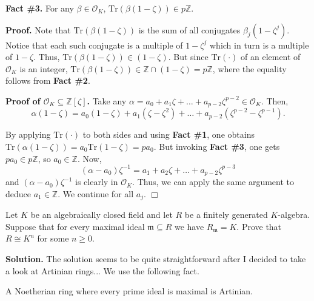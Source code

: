 \documentclass{template}
\newcommand{\qedwhite}{\hfill \ensuremath{\Box}}
\begin{document}
\textcolor{blue!70!black}{\textbf{Fact \#3.}} For any $\beta \in \mathcal{O}_K$,
$\text{Tr}(\beta(1-\zeta)) \in p\mathbb{Z}$. 

\textbf{Proof.} Note that $\text{Tr}(\beta(1-\zeta))$ is the sum of all
conjugates $\beta_j(1-\zeta^j)$. Notice that each such conjugate is a multiple
of $1-\zeta^j$ which in turn is a multiple of $1-\zeta$. Thus,
$\text{Tr}(\beta(1-\zeta)) \in (1-\zeta)$. But since $\text{Tr}(\cdot)$ of an
element of $\mathcal{O}_K$ is an integer, $\text{Tr}(\beta(1-\zeta)) \in
\mathbb{Z} \cap (1-\zeta) = p\mathbb{Z}$, where the equality follows from
\textcolor{blue!70!black}{\textbf{Fact \#2}}.

\textcolor{green!50!black}{\textbf{Proof of $\mathcal{O}_K \subseteq
\mathbb{Z}[\zeta]$.}} Take any $\alpha = a_0+a_1\zeta+\dots+a_{p-2}\zeta^{p-2}
\in \mathcal{O}_K$. Then,
\begin{equation*}
    \alpha(1-\zeta) = a_0(1-\zeta) + a_1(\zeta-\zeta^2) + \dots + a_{p-2}(\zeta^{p-2}-\zeta^{p-1}).
\end{equation*}

By applying $\text{Tr}(\cdot)$ to both sides and using
\textcolor{blue!70!black}{\textbf{Fact \#1}}, one obtains
$\text{Tr}(\alpha(1-\zeta)) = a_0\text{Tr}(1-\zeta) = pa_0$. But invoking
\textcolor{blue!70!black}{\textbf{Fact \#3}}, one gets $pa_0 \in p\mathbb{Z}$,
so $a_0 \in \mathbb{Z}$. Now,
\begin{equation*}
    (\alpha - a_0)\zeta^{-1} = a_1 + a_2\zeta + \dots + a_{p-2}\zeta^{p-3}
\end{equation*}
and $(\alpha-a_0)\zeta^{-1}$ is clearly in $\mathcal{O}_K$. Thus, we can apply
the same argument to deduce $a_1 \in \mathbb{Z}$. We continue for all $a_j$. \qedwhite

\begin{problem}[Exercise 3]
    Let $K$ be an algebraically closed field and let $R$ be a finitely generated
    $K$-algebra. Suppose that for every maximal ideal $\mathfrak{m} \subseteq R$
    we have $R_{\mathfrak{m}} = K$. Prove that $R \cong K^n$ for some $n \geq
    0$.
\end{problem}

\textbf{Solution.} The solution seems to be quite straightforward after I
decided to take a look at Artinian rings... We use the following fact.

\begin{propositions}
    A Noetherian ring where every prime ideal is maximal is Artinian.
\end{propositions}
\end{document}
